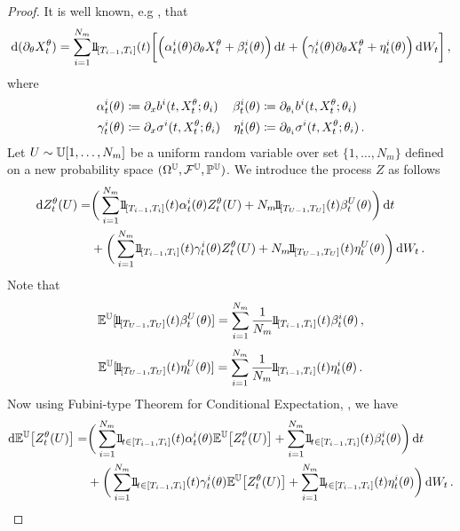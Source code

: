 \begin{proof}
It is well known, e.g \cite{Krylov1999OnDiffusions, Kunita1997StochasticEquations}, that
\[
\begin{split}
\D (\partial_\theta X_t^{\theta}) = \sum_{i=1}^{N_{m}} \ind_{[T_{i-1},T_i]}(t)   \bigg[  \Big( \alpha^i_t(\theta)\partial_{\theta} X_t^{\theta}   +   \beta^i_t(\theta)\Big)\, \D t  
 + \Big( \gamma^i_t(\theta) \partial_{\theta} X_t^{\theta}   +   \eta^i_t(\theta) \Big)\,\D W_t \bigg] \,,	
\end{split}
\]
where 
\begin{align*}
\alpha^i_t(\theta) &\coloneqq  \partial_x b^i(t,X_t^\theta; \theta_i) & \beta^i_t(\theta) &\coloneqq  \partial_{\theta_i} b^i(t,X_t^\theta;\theta_i) \\
\gamma^i_t(\theta) &\coloneqq  \partial_x \sigma^i(t,X_t^\theta; \theta_i) & \eta^i_t(\theta) &\coloneqq  \partial_{\theta_i} \sigma^i(t,X_t^\theta; \theta_i)\,.
\end{align*}
Let $U\sim \mathbb{U}[1,\ldots,N_{m}]$ be a uniform random variable over set $\{1,\dots, N_{m}\}$ defined on a new probability space $( \Omega^{\mathbb{U}}, \mathcal{F}^{\mathbb{U}}, \mathbb{P}^{\mathbb{U}})$. 
We introduce the process $Z$ as follows
\[
\begin{split}
\D Z_t^{\theta}(U) = & \bigg(\sum_{i=1}^{N_{m}} \ind_{[T_{i-1},T_i]}(t) \alpha^i_t(\theta) Z_t^{\theta}(U)   +  N_m \ind_{[T_{U-1},T_U]}(t) \beta^U_t(\theta) \bigg)\, \D t \\  
& + \bigg(\sum_{i=1}^{N_{m}} \ind_{[T_{i-1},T_i]}(t)\gamma^i_t(\theta)  Z_t^{\theta}(U)   +  N_m \ind_{[T_{U-1},T_U]}(t) \eta^U_t(\theta) \bigg)\, \D W_t \,. 
\end{split}
\]
Note that
\[
\EE^{\UU}[ \ind_{[T_{U-1},T_U]}(t)\beta^U_t(\theta) ] = \sum_{i=1}^{N_{m}} \frac1{N_m}\ind_{[T_{i-1},T_i]}(t) \beta^i_t(\theta)\,,
\]
\[
\EE^{\UU}[\ind_{[T_{U-1},T_U]}(t) \eta^U_t(\theta) ] = \sum_{i=1}^{N_{m}} \frac1{N_m}\ind_{[T_{i-1},T_i]}(t) \eta^i_t(\theta) \,.
\]
Now using Fubini-type Theorem for Conditional Expectation, \cite[Lemma A5]{Hammersley2021WeakNoise}, we have
\[
\begin{split}
\D\EE^{\UU} \big[Z_t^{\theta}(U)\big] =  & \bigg(\sum_{i=1}^{N_{m}} \ind_{t\in[T_{i-1},T_i]}(t) \alpha^i_t(\theta)  \EE^{\UU} \big[Z_t^{\theta}(U)\big]   +  \sum_{i=1}^{N_{m}} \ind_{t\in[T_{i-1},T_i]}(t) \beta^i_t(\theta)  \bigg)\,\D t \\  
& + \bigg(\sum_{i=1}^{N_{m}} \ind_{t\in[T_{i-1},T_i]}(t) \gamma^i_t(\theta)  \EE^{\UU} \big[Z_t^{\theta}(U)\big]  +  \sum_{i=1}^{N_{m}} \ind_{t\in[T_{i-1},T_i]}(t) \eta^i_t(\theta)  \bigg)\, \D W_t \,. 

\end{split}\]
\end{proof}
